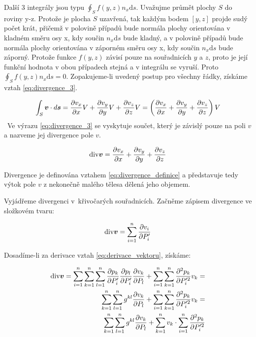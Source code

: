 Další 3 integrály jsou typu \(\oint_S f(y, z) n_x \mathrm{d}s\). Uvažujme průmět plochy \(S\) do roviny y-z. Protože je plocha \(S\) uzavřená, tak každým bodem \([y, z]\) projde sudý počet krát, přičemž v polovině případů bude normála plochy orientována v kladném směru osy x, kdy součin \(n_x \mathrm{d}s\) bude kladný, a v polovině případů bude normála plochy orientována v záporném směru osy x, kdy součin \(n_x \mathrm{d}s\) bude záporný. Protože funkce \(f(y, z)\) závisí pouze na souřadnicích \(y\) a \(z\), proto je její funkční hodnota v obou případech stejná a v integrálu se vyruší. Proto \(\oint_S f(y, z) n_x \mathrm{d}s = 0\). Zopakujeme-li uvedený postup pro všechny řádky, získáme vztah \eqref{eq:divergence_3}.

\begin{equation}
\label{eq:divergence_3}
\int_S \boldsymbol{v} \cdot d\boldsymbol{s} = \frac{\partial v_x}{\partial x} V + \frac{\partial v_y}{\partial y} V + \frac{\partial v_z}{\partial z} V = \left(\frac{\partial v_x}{\partial x} + \frac{\partial v_y}{\partial y} + \frac{\partial v_z}{\partial z}\right) V
\end{equation}
\
Ve výrazu \eqref{eq:divergence_3} se vyskytuje součet, který je závislý pouze na poli \(v\) a nazveme jej divergence pole \(v\). 

\begin{equation}
\label{eq:divergence_definice}
\mathrm{div} \boldsymbol{v} = \frac{\partial v_x}{\partial x} + \frac{\partial v_y}{\partial y} + \frac{\partial v_z}{\partial z}
\end{equation}

Divergence je definována vztahem \eqref{eq:divergence_definice} a představuje tedy výtok pole \(v\) z nekonečně malého tělesa dělená jeho objemem.

Vyjádřeme divergenci v~křivočarých souřadnicích. Začněme zápisem divergence ve složkovém tvaru:

\begin{equation}
\mathrm{div} \boldsymbol{v} = \sum_{i=1}^n \frac{\partial v_i}{\partial P'_i}
\end{equation}

Dosadíme-li za derivace vztah \eqref{eq:derivace_vektoru}, získáme:

\begin{equation}
\begin{split}
\mathrm{div} \boldsymbol{v} = \sum_{i=1}^n \sum_{k=1}^n \sum_{l=1}^n \frac{\partial p_k}{\partial P'_i} \frac{\partial p_l}{\partial P'_i} \frac{\partial v_k}{\partial P_l} + \sum_{i=1}^n \sum_{k=1}^n \frac{\partial^2 p_k}{\partial P'^2_i} v_k = \\
\sum_{k=1}^n \sum_{l=1}^n g^{kl} \frac{\partial v_k}{\partial P_l} + \sum_{i=1}^n \sum_{k=1}^n \frac{\partial^2 p_k}{\partial P'^2_i} v_k = \\
\sum_{k=1}^n \sum_{l=1}^n g^{kl} \frac{\partial v_k}{\partial P_l} + \sum_{k=1}^n v_k \cdot \sum_{i=1}^n \frac{\partial^2 p_k}{\partial P'^2_i}
\end{split}
\end{equation}

